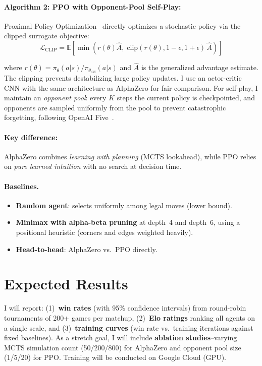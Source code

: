 \documentclass[10pt]{article}
\begin{document}
\paragraph{Algorithm 2: PPO with Opponent-Pool Self-Play:}
Proximal Policy Optimization~\cite{schulman2017proximal} directly optimizes a stochastic policy via the clipped surrogate objective:
\vspace{-0.3em}
\[
    \textstyle \mathcal{L}_{\text{CLIP}} = \mathbb{E}\!\left[\min\!\left(r(\theta)\hat{A},\; \text{clip}(r(\theta), 1{-}\epsilon, 1{+}\epsilon)\,\hat{A}\right)\right]
\]
\vspace{-0.5em}

\noindent where $r(\theta) = \pi_\theta(a|s)/\pi_{\theta_{\text{old}}}(a|s)$ and $\hat{A}$ is the generalized advantage estimate. The clipping prevents destabilizing large policy updates. I use an actor-critic CNN with the same architecture as AlphaZero for fair comparison. For self-play, I maintain an \emph{opponent pool}: every $K$ steps the current policy is checkpointed, and opponents are sampled uniformly from the pool to prevent catastrophic forgetting, following OpenAI Five~\cite{berner2019dota}.

\paragraph{Key difference:}
AlphaZero combines \emph{learning with planning} (MCTS lookahead), while PPO relies on \emph{pure learned intuition} with no search at decision time.

\paragraph{Baselines.}
\begin{itemize}[nosep,leftmargin=*]
    \item \textbf{Random agent}: selects uniformly among legal moves (lower bound).
    \item \textbf{Minimax with alpha-beta pruning} at depth~4 and depth~6, using a positional heuristic (corners and edges weighted heavily).
    \item \textbf{Head-to-head}: AlphaZero vs.\ PPO directly.
\end{itemize}

\section{Expected Results}

I will report: (1)~\textbf{win rates} (with 95\% confidence intervals) from round-robin tournaments of 200+ games per matchup, (2)~\textbf{Elo ratings} ranking all agents on a single scale, and (3)~\textbf{training curves} (win rate vs.\ training iterations against fixed baselines). As a stretch goal, I will include \textbf{ablation studies}--varying MCTS simulation count (50/200/800) for AlphaZero and opponent pool size (1/5/20) for PPO. Training will be conducted on Google Cloud (GPU).
\end{document}

